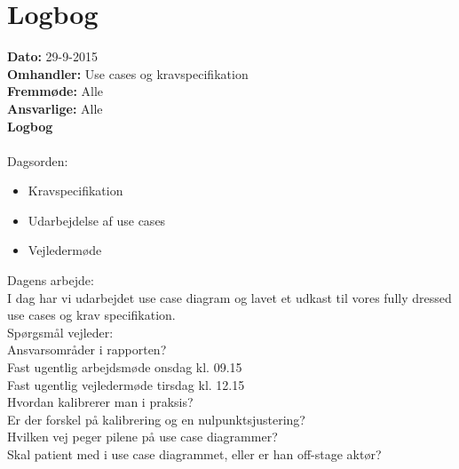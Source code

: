 \section{Logbog}

\textbf{Dato:} 29-9-2015 \\
\textbf{Omhandler:} Use cases og kravspecifikation\\
\textbf{Fremmøde:} Alle\\
\textbf{Ansvarlige:} Alle\\
\textbf{Logbog}
\\
\\
Dagsorden:
\begin{itemize}
	\item Kravspecifikation
	\item Udarbejdelse af use cases
	\item Vejledermøde
\end{itemize}

Dagens arbejde: \\
I dag har vi udarbejdet use case diagram og lavet et udkast til vores fully dressed use cases og krav specifikation.\\


Spørgsmål vejleder: \\
Ansvarsområder i rapporten?\\
Fast ugentlig arbejdsmøde onsdag kl. 09.15\\
Fast ugentlig vejledermøde tirsdag kl. 12.15\\
Hvordan kalibrerer man i praksis?\\
Er der forskel på kalibrering og en nulpunktsjustering?\\
Hvilken vej peger pilene på use case diagrammer?\\
Skal patient med i use case diagrammet, eller er han off-stage aktør?\\
